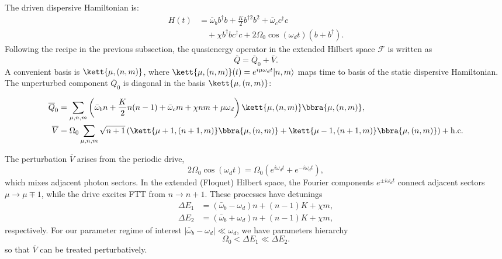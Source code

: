 The driven dispersive Hamiltonian is:
\begin{equation}
\begin{split}
\label{Driven dispersive}
    H(t) &= \bar{\omega}_b b^\dagger b + \frac{K}{2} b^{\dagger 2} b^2 + \bar{\omega}_c c^\dagger c \\
    &\quad + \chi b^\dagger b c^\dagger c + 2\Omega_0 \cos(\omega_d t) (b + b^\dagger).
\end{split}
\end{equation}
Following the recipe in the previous subsection, the quasienergy operator in the extended Hilbert space $\mathcal{F}$ is written as
\begin{equation}
    \overline{Q} = \overline{Q}_0 + \overline{V}.
\end{equation}
A convenient basis is $\kett{\mu,(n,m)}$, where $\kett{\mu,(n,m)}(t) = e^{i\mu\omega_dt}|n,m\rangle$ maps time to basis of the static dispersive Hamiltonian. The unperturbed component $\overline{Q}_0$ is diagonal in the basis $\kett{\mu,(n,m)}$:
\begin{widetext}
\begin{align}
\overline{Q}_0 &= \sum_{\mu,n,m} \left( \bar{\omega}_b n + \frac{K}{2} n(n-1) + \bar{\omega}_c m + \chi nm + \mu \omega_d \right)
\kett{\mu,(n,m)}\bbra{\mu,(n,m)}, \\
\overline{V} &= \Omega_0 \sum_{\mu,n,m} \sqrt{n+1}
\left( \kett{\mu+1,(n+1,m)}\bbra{\mu,(n,m)}
+ \kett{\mu-1,(n+1,m)}\bbra{\mu,(n,m)} \right)
+ \text{h.c.}
\end{align}
\end{widetext}

The perturbation $\overline{V}$ arises from the periodic drive,
\begin{equation}
    2\Omega_0 \cos(\omega_d t)=\Omega_0\!\left(e^{i\omega_d t}+e^{-i\omega_d t}\right),
\end{equation}
which mixes adjacent photon sectors. In the extended (Floquet) Hilbert space, the Fourier components $e^{\pm i\omega_d t}$ connect adjacent sectors $\mu\to\mu\mp 1$, while the drive excites FTT from $n\to n+1$. These processes have detunings
\begin{align}
    \Delta E_1 &= (\bar{\omega}_b - \omega_d)n + (n-1)K + \chi m,\\
    \Delta E_2 &=(\bar{\omega}_b + \omega_d)n + (n-1)K + \chi m,
\end{align}
respectively.
For our parameter regime of interest $|\bar{\omega}_b - \omega_d|\ll\omega_d$, we have parameters hierarchy
\begin{equation}
\label{hierarchy}
    \Omega_0 < \Delta E_1 \ll \Delta E_2.
\end{equation}
so that $\overline{V}$ can be treated perturbatively.

